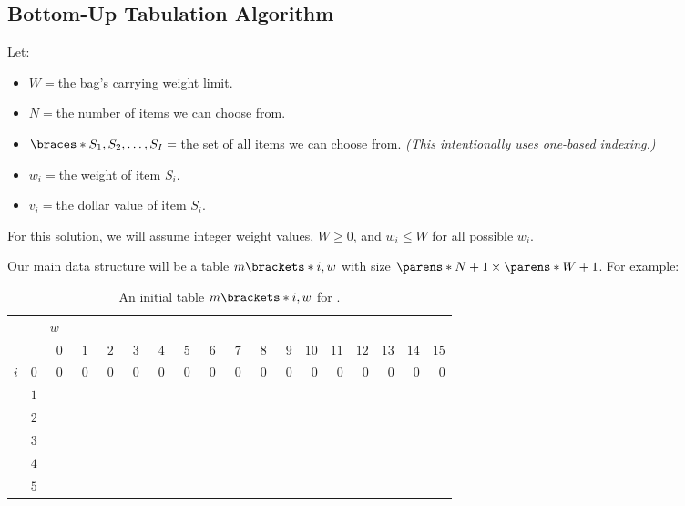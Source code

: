 \subsection{Bottom-Up Tabulation Algorithm}

Let:
\begin{itemize}
    \item $W = {}$the bag's carrying weight limit.
    \item $N = {}$the number of items we can choose from.
    \item $\braces*{S_1, S_2, \dots, S_I} = {}$the set of all items we can choose from. \emph{(This intentionally uses one-based indexing.)}
    \item $w_i = {}$the weight of item $S_i$.
    \item $v_i = {}$the dollar value of item $S_i$.
\end{itemize}

For this solution, we will assume integer weight values, $W \ge 0$, and $w_i \le W$ for all possible $w_i$.

Our main data structure will be a table $m \brackets*{i, w}$ with size $\parens*{N + 1} \times \parens*{W + 1}$. For example:

\begin{table}[H]
    \centering
    \caption{An initial table $m \brackets*{i, w}$ for .}
    \label{tab:0-1-knapsack-problem--ds}
    \begin{tabular}{cr|rrrrrrrrrrrrrrrr|}
        {}
            &
            & \multicolumn{16}{l|}{$w$} \\
        {}
            &
            & $\phantom{0}0$ & $\phantom{0}1$ & $\phantom{0}2$ & $\phantom{0}3$
            & $\phantom{0}4$ & $\phantom{0}5$ & $\phantom{0}6$ & $\phantom{0}7$
            & $\phantom{0}8$ & $\phantom{0}9$
            & $10$ & $11$ & $12$ &$13$ & $14$ & $15$ \\ \hline
        $i$
            & $0$
            & $0$ & $0$ & $0$ & $0$ & $0$ & $0$ & $0$ & $0$
            & $0$ & $0$ & $0$ & $0$ & $0$ & $0$ & $0$ & $0$ \\
        {}
            & $1$
            & & & & & & & & & & & & & & & & \\
        {}
            & $2$
            & & & & & & & & & & & & & & & & \\
        {}
            & $3$
            & & & & & & & & & & & & & & & & \\
        {}
            & $4$
            & & & & & & & & & & & & & & & & \\
        {}
            & $5$
            & & & & & & & & & & & & & & & & \\ \hline
    \end{tabular}
\end{table}

